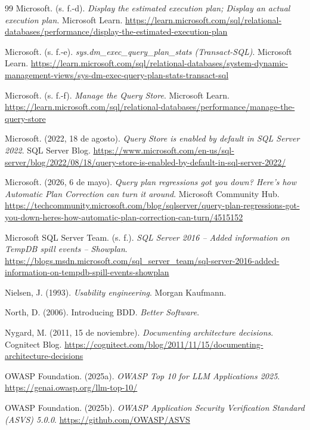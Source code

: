 \documentclass[12pt,a4paper]{article}
\begin{document}
\begin{thebibliography}{99}
 Microsoft. (s. f.-d). \textit{Display the estimated execution plan; Display an actual execution plan}. Microsoft Learn. \url{https://learn.microsoft.com/sql/relational-databases/performance/display-the-estimated-execution-plan}

 Microsoft. (s. f.-e). \textit{sys.dm\_exec\_query\_plan\_stats (Transact-SQL)}. Microsoft Learn. \url{https://learn.microsoft.com/sql/relational-databases/system-dynamic-management-views/sys-dm-exec-query-plan-stats-transact-sql}

 Microsoft. (s. f.-f). \textit{Manage the Query Store}. Microsoft Learn. \url{https://learn.microsoft.com/sql/relational-databases/performance/manage-the-query-store}

 Microsoft. (2022, 18 de agosto). \textit{Query Store is enabled by default in SQL Server 2022}. SQL Server Blog. \url{https://www.microsoft.com/en-us/sql-server/blog/2022/08/18/query-store-is-enabled-by-default-in-sql-server-2022/}

 Microsoft. (2026, 6 de mayo). \textit{Query plan regressions got you down? Here's how Automatic Plan Correction can turn it around}. Microsoft Community Hub. \url{https://techcommunity.microsoft.com/blog/sqlserver/query-plan-regressions-got-you-down-heres-how-automatic-plan-correction-can-turn/4515152}

 Microsoft SQL Server Team. (s. f.). \textit{SQL Server 2016 -- Added information on TempDB spill events -- Showplan}. \url{https://blogs.msdn.microsoft.com/sql_server_team/sql-server-2016-added-information-on-tempdb-spill-events-showplan}

 Nielsen, J. (1993). \textit{Usability engineering}. Morgan Kaufmann.

 North, D. (2006). Introducing BDD. \textit{Better Software}.

 Nygard, M. (2011, 15 de noviembre). \textit{Documenting architecture decisions}. Cognitect Blog. \url{https://cognitect.com/blog/2011/11/15/documenting-architecture-decisions}

 OWASP Foundation. (2025a). \textit{OWASP Top 10 for LLM Applications 2025}. \url{https://genai.owasp.org/llm-top-10/}

 OWASP Foundation. (2025b). \textit{OWASP Application Security Verification Standard (ASVS) 5.0.0}. \url{https://github.com/OWASP/ASVS}


\end{thebibliography}
\end{document}
